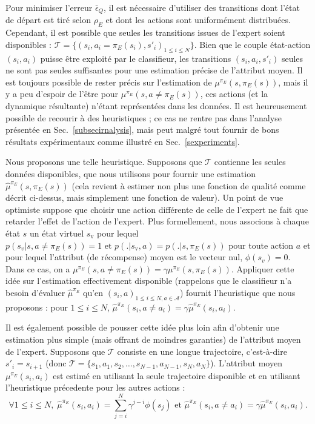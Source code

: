 \documentclass[french,utf8]{./hermes-journal}
\newcommand{\A}{\mathcal{A}}
\newcommand{\T}{\mathcal{T}}
\begin{document}
Pour minimiser l'erreur $\bar{\epsilon}_Q$, il est nécessaire d'utiliser des transitions dont l'état de départ est tiré selon 
$\rho_E$ et dont les actions sont uniformément distribuées. Cependant, il est possible que seules les transitions issues de l'expert soient disponibles : $\T =
\{(s_i,a_i=\pi_E(s_i),s'_i)_{1\leq i \leq N}\}$. Bien que le couple état-action $(s_i,a_i)$ puisse être exploité par le classifieur, les transitions $(s_i,a_i,s'_i)$ seules ne sont pas seules suffisantes pour une estimation précise de l'attribut moyen. Il est toujours possible de rester précis sur l'estimation de $\mu^{\pi_E}(s,\pi_E(s))$, mais il y a peu d'espoir de l'être pour $\mu^{\pi_E}(s,a\neq\pi_E(s))$, ces actions (et la dynamique résultante) n'étant représentées dans les données. Il est heureusement possible de recourir à des heuristiques ; ce cas ne rentre pas dans l'analyse présentée en 
Sec.~\ref{subsecirnalysis}, mais peut malgré tout fournir de bons résultats expérimentaux comme illustré en Sec.~\ref{sexperiments}.


Nous proposons une telle heuristique. Supposons que  $\T$ contienne les seules données disponibles, que nous utilisons pour fournir une estimation 
$\hat{\mu}^{\pi_E}(s,\pi_E(s))$ (cela revient à estimer non plus une fonction de qualité comme décrit ci-dessus, mais simplement une fonction de valeur). Un point de vue optimiste suppose que choisir une action différente de celle de l'expert ne fait que retarder l'effet de l'action de l'expert. Plus formellement, nous associons à chaque état $s$ un état virtuel $s_\text{v}$ pour lequel $p(s_v|s,a\neq \pi_E(s))=1 \textrm{ et } p(.|s_\text{v},a)=p(.|s,\pi_E(s))$ pour toute action $a$ et pour lequel l'attribut (de récompense) moyen est le vecteur nul, $\phi(s_v) = 0$. Dans ce cas, on a
$\mu^{\pi_E}(s,a\neq\pi_E(s)) = \gamma \mu^{\pi_E}(s,\pi_E(s))$.
Appliquer cette idée sur l'estimation effectivement disponible (rappelons que le classifieur n'a besoin d'évaluer  $\hat{\mu}^{\pi_E}$ qu'en
$(s_i,a)_{1\leq i\leq N,a\in \A}$) fournit l'heuristique que nous proposons :
pour $1\leq i\leq N$, $\hat{\mu}^{\pi_E}(s_i,a\neq a_i) = \gamma
\hat{\mu}^{\pi_E}(s_i,a_i)$.

Il est également possible de pousser cette idée plus loin afin d'obtenir une estimation plus simple (mais offrant de moindres garanties) de l'attribut moyen de l'expert.
Supposons que  $\T$ consiste en une longue trajectoire, c'est-à-dire
$s'_i = s_{i+1}$ (donc $\T =
\{s_1,a_1,s_2,\dots,s_{N-1},a_{N-1},s_N,a_N\}$). L'attribut moyen 
$\mu^{\pi_E}(s_i,a_i)$ est estimé en utilisant la seule trajectoire disponible et en utilisant l'heuristique précedente pour les autres actions :
\begin{equation}
  \forall 1\leq i \leq N,\; \hat{\mu}^{\pi_E}(s_i,a_i) =
  \sum_{j=i}^N \gamma^{j-i}\phi(s_j) \text{ et }
  \hat{\mu}^{\pi_E}(s_i,a\neq a_i) = \gamma
  \hat{\mu}^{\pi_E}(s_i,a_i).
  \label{ec_plus_heuristic}
\end{equation}
\end{document}
